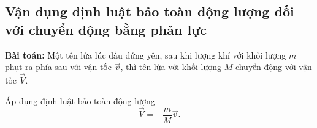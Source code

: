\subsection{Vận dụng định luật bảo toàn động lượng đối với chuyển động bằng phản lực}
\textbf{Bài toán: }Một tên lửa lúc đầu đứng yên, sau khi lượng khí với khối lượng $m$ phụt ra phía sau với vận tốc $\vec{v}$, thì tên lửa với khối lượng $M$ chuyển động với vận tốc $\vec{V}$.

Áp dụng định luật bảo toàn động lượng 
\begin{equation*}
	\vec{V}= - \dfrac{m}{M} \vec{v}.
\end{equation*}

